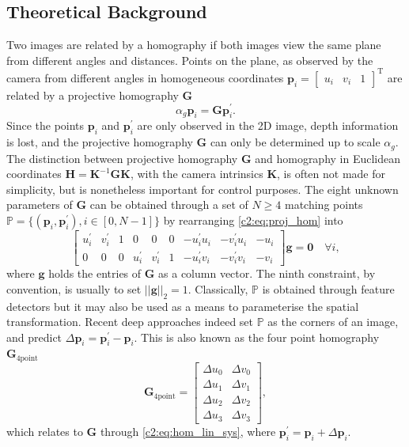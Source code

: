 \subsection{Theoretical Background}
Two images are related by a homography if both images view the same plane from different angles and distances. Points on the plane, as observed by the camera from different angles in homogeneous coordinates $\mathbf{p}_i = \begin{bmatrix}u_i&v_i&1\end{bmatrix}^\text{T}$ are related by a projective homography $\mathbf{G}$ \cite{malis2007deeper}
\begin{equation}
    \alpha_g\mathbf{p}_i = \mathbf{G}\mathbf{p}_i^\prime.
    \label{c2:eq:proj_hom}
\end{equation}
Since the points $\mathbf{p}_i$ and $\mathbf{p}_i^\prime$ are only observed in the 2D image, depth information is lost, and the projective homography $\mathbf{G}$ can only be determined up to scale $\alpha_g$. The distinction between projective homography $\mathbf{G}$ and homography in Euclidean coordinates $\mathbf{H} = \mathbf{K}^{-1}\mathbf{G}\mathbf{K}$, with the camera intrinsics $\mathbf{K}$, is often not made for simplicity, but is nonetheless important for control purposes. The eight unknown parameters of $\mathbf{G}$ can be obtained through a set of $N\geq4$ matching points $\mathbb{P} = \{(\mathbf{p}_i, \mathbf{p}^\prime_i), i\in[0,N-1]\}$ by rearranging \eqref{c2:eq:proj_hom} into
\begin{equation}
    \begin{bmatrix}
        u^\prime_i & v^\prime_i & 1 & 0   &   0 & 0 & -u^\prime_i u_i & -v^\prime_i u_i & -u_i \\
        0   &   0 & 0 & u^\prime_i & v^\prime_i & 1 & -u^\prime_i v_i & -v^\prime_i v_i & - v_i
    \end{bmatrix}\mathbf{g}= \mathbf{0}\quad\forall i,
    \label{c2:eq:hom_lin_sys}
\end{equation}
where $\mathbf{g}$ holds the entries of $\mathbf{G}$ as a column vector. The ninth constraint, by convention, is usually to set $||\mathbf{g}||_2 = 1$. Classically, $\mathbb{P}$ is obtained through feature detectors but it may also be used as a means to parameterise the spatial transformation.
Recent deep approaches indeed set $\mathbb{P}$ as the corners of an image, and predict $\Delta \mathbf{p}_i = \mathbf{p}^\prime_i - \mathbf{p}_i$. This is also known as the four point homography $\mathbf{G}_{4\text{point}}$
\begin{equation}
    \mathbf{G}_{4\text{point}} = \begin{bmatrix}
        \Delta u_0 & \Delta v_0 \\
        \Delta u_1 & \Delta v_1 \\
        \Delta u_2 & \Delta v_2 \\
        \Delta u_3 & \Delta v_3
    \end{bmatrix},
    \label{c2:eq:4pt}
\end{equation}
which relates to $\mathbf{G}$ through \eqref{c2:eq:hom_lin_sys}, where $\mathbf{p}^\prime_i = \mathbf{p}_i + \Delta \mathbf{p}_i$.    

